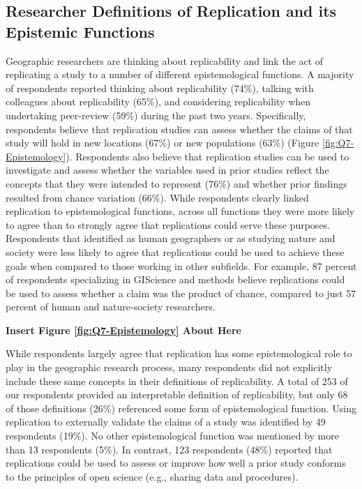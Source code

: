 \documentclass[]{interact}
\theoremstyle{plain}%
\theoremstyle{definition}
\theoremstyle{remark}
\begin{document}
\subsection*{Researcher Definitions of Replication and its Epistemic Functions}
Geographic researchers are thinking about replicability and link the act of replicating a study to a number of different epistemological functions. 
A majority of respondents reported thinking about replicability (74\%), talking with colleagues about replicability (65\%), and considering replicability when undertaking peer-review (59\%) during the past two years. 
Specifically, respondents believe that replication studies can assess whether the claims of that study will hold in new locations (67\%) or new populations (63\%) (Figure \ref{fig:Q7-Epistemology}).
Respondents also believe that replication studies can be used to investigate and assess whether the variables used in prior studies reflect the concepts that they were intended to represent (76\%) and whether prior findings resulted from chance variation (66\%).
While respondents clearly linked replication to epistemological functions, across all functions they were more likely to agree than to strongly agree that replications could serve these purposes.
Respondents that identified as human geographers or as studying nature and society were less likely to agree that replications could be used to achieve these goals when compared to those working in other subfields. 
For example, 87 percent of respondents specializing in GIScience and methods believe replications could be used to assess whether a claim was the product of chance, compared to just 57 percent of human and nature-society researchers.

\begin{center}
\textbf{Insert Figure \ref{fig:Q7-Epistemology} About Here}
\end{center}

While respondents largely agree that replication has some epistemological role to play in the geographic research process, many respondents did not explicitly include these same concepts in their definitions of replicability.
A total of 253 of our respondents provided an interpretable definition of replicability, but only 68 of those definitions (26\%) referenced some form of epistemological function. 
Using replication to externally validate the claims of a study was identified by 49 respondents (19\%).
No other epistemological function was mentioned by more than 13 respondents (5\%).  
In contrast, 123 respondents (48\%) reported that replications could be used to assess or improve how well a prior study conforms to the principles of open science (e.g., sharing data and procedures).
\end{document}
